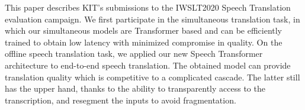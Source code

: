This paper describes KIT's submissions to the IWSLT2020 Speech Translation evaluation campaign. We first participate in the simultaneous translation task, in which our simultaneous models are Transformer based and can be efficiently trained to obtain low latency with minimized compromise in quality. On the offline speech translation task, we applied our new Speech Transformer architecture to end-to-end speech translation. The obtained model can provide translation quality which is competitive to a complicated cascade. The latter still has the upper hand, thanks to the ability to transparently access to the transcription, and resegment the inputs to avoid fragmentation.
